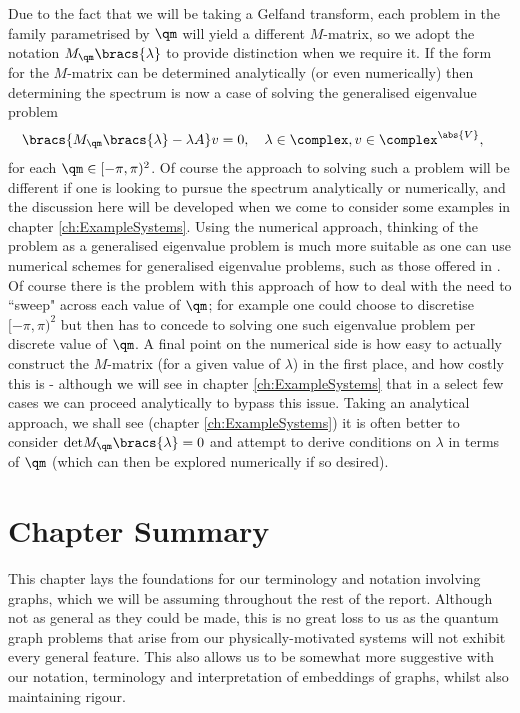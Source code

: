 Due to the fact that we will be taking a Gelfand transform, each problem in the family parametrised by $\qm$ will yield a different $M$-matrix, so we adopt the notation $M_{\qm}\bracs{\lambda}$ to provide distinction when we require it.
If the form for the $M$-matrix can be determined analytically (or even numerically) then determining the spectrum is now a case of solving the generalised eigenvalue problem
\begin{align} \label{eq:M-MatrixEvalProb}
	\bracs{M_{\qm}\bracs{\lambda}-\lambda A}v &= 0, \quad \lambda\in\complex, v\in\complex^{\abs{V}},
\end{align}
for each $\qm\in[-\pi,\pi)^2$.
Of course the approach to solving such a problem will be different if one is looking to pursue the spectrum analytically or numerically, and the discussion here will be developed when we come to consider some examples in chapter \ref{ch:ExampleSystems}.
Using the numerical approach, thinking of the problem as a generalised eigenvalue problem is much more suitable as one can use numerical schemes for generalised eigenvalue problems, such as those offered in \cite{guttel2017nonlinear}.
Of course there is the problem with this approach of how to deal with the need to ``sweep" across each value of $\qm$; for example one could choose to discretise $[-\pi,\pi)^2$ but then has to concede to solving one such eigenvalue problem per discrete value of $\qm$.
A final point on the numerical side is how easy to actually construct the $M$-matrix (for a given value of $\lambda$) in the first place, and how costly this is - although we will see in chapter \ref{ch:ExampleSystems} that in a select few cases we can proceed analytically to bypass this issue.
Taking an analytical approach, we shall see (chapter \ref{ch:ExampleSystems}) it is often better to consider $\mathrm{det}M_{\qm}\bracs{\lambda} = 0$ and attempt to derive conditions on $\lambda$ in terms of $\qm$ (which can then be explored numerically if so desired).

\section{Chapter Summary} \label{sec:QGSummary}
This chapter lays the foundations for our terminology and notation involving graphs, which we will be assuming throughout the rest of the report.
Although not as general as they could be made, this is no great loss to us as the quantum graph problems that arise from our physically-motivated systems will not exhibit every general feature.
This also allows us to be somewhat more suggestive with our notation, terminology and interpretation of embeddings of graphs, whilst also maintaining rigour. \newline

